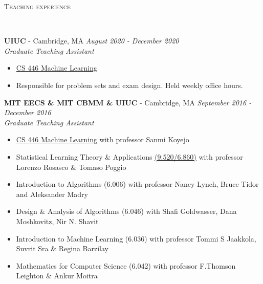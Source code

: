 \documentclass{article}
\newenvironment{changemargin}[2]{%
  \begin{list}{}{%
    \setlength{\topsep}{0pt}%
    \setlength{\leftmargin}{#1}%
    \setlength{\rightmargin}{#2}%
    \setlength{\listparindent}{\parindent}%
    \setlength{\itemindent}{\parindent}%
    \setlength{\parsep}{\parskip}%
  }%
  \item[]}{\end{list}
}
\newcommand{\lineover}{
	\begin{changemargin}{-0.05in}{-0.05in}
		\vspace*{-8pt}
		\hrulefill \\
		\vspace*{-2pt}
	\end{changemargin}
}
\newcommand{\header}[1]{
	\begin{changemargin}{-0.5in}{-0.5in}
		\scshape{#1}\\
  	\lineover
	\end{changemargin}
}
\newenvironment{body} {
	\vspace*{-16pt}
	\begin{changemargin}{-0.25in}{-0.5in}
  }	
	{\end{changemargin}
}
\begin{document}



\header{Teaching experience}
\begin{body}
	\vspace{16pt}
	
    \textbf{UIUC} - Cambridge, MA \hfill \emph{August 2020 - December 2020}\\
	\emph{Graduate Teaching Assistant}\\
	\vspace*{-3pt}
	\begin{itemize} \itemsep -2pt
		\item \href{https://relate.cs.illinois.edu/course/CS446-fa20/}{CS 446 Machine Learning}
		\item Responsible for problem sets and exam design. Held weekly office hours.
	\end{itemize}
    
    \textbf{MIT EECS \& MIT CBMM \& UIUC} - Cambridge, MA \hfill \emph{September 2016 - December 2016}\\
	\emph{Graduate Teaching Assistant}\\
	\vspace*{-3pt}
	\begin{itemize} \itemsep -2pt
        \item \href{https://relate.cs.illinois.edu/course/CS446-fa20/}{CS 446 Machine Learning} with professor Sanmi Koyejo
	\item Statistical Learning Theory \& Applications \href{http://www.mit.edu/~9.520/fall16/}{(9.520/6.860)} with professor Lorenzo Rosasco \& Tomaso Poggio
        \item Introduction to Algorithms (6.006) with professor Nancy Lynch, Bruce Tidor and Aleksander Madry
        \item Design \& Analysis of Algorithms (6.046) with Shafi Goldwasser, Dana Moshkovitz, Nir N. Shavit
        \item Introduction to Machine Learning (6.036) with professor Tommi S Jaakkola, Suvrit Sra \& Regina Barzilay
	\item Mathematics for Computer Science (6.042) with professor F.Thomson Leighton \& Ankur Moitra
        \end{itemize}



\end{body}
\end{document}
